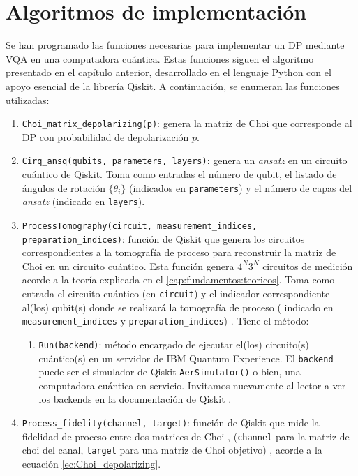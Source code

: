 \documentclass[letterpaper,12pt]{thesisECFM}
\theoremstyle{plain}
\theoremstyle{definition}
\theoremstyle{remark}
\newcommand{\1}{\mathbb{1}}
\begin{document}
\section{Algoritmos de implementación} %
Se han programado las funciones necesarias para implementar un DP mediante VQA
en una computadora cuántica. Estas funciones siguen el algoritmo presentado en
el capítulo anterior, desarrollado en el lenguaje Python con el apoyo esencial
de la librería Qiskit. A continuación, se enumeran las funciones utilizadas: 
\begin{enumerate}
    \item \texttt{Choi\_matrix\_depolarizing(p)}: genera la matriz de Choi que
corresponde al DP con probabilidad de depolarización $p$.

    \item \texttt{Cirq\_ansq(qubits, parameters, layers)}: genera un \textit{ansatz} en
un circuito cuántico de Qiskit. Toma como entradas el número de
 qubit, el listado de ángulos de rotación $\{\theta_i\}$ (indicados en
\texttt{parameters}) y el número de capas del \textit{ansatz} (indicado en
\texttt{layers}).

    \item \texttt{ProcessTomography(circuit, measurement\_indices,
preparation\_indices)}: función de Qiskit que genera los circuitos
correspondientes a la tomografía de proceso para reconstruir la matriz de Choi
en un circuito cuántico. Esta función genera $4^N3^N$ circuitos de medición
acorde a la teoría explicada en el \autoref{cap:fundamentos:teoricos}. Toma como entrada el circuito
cuántico (en  \texttt{circuit})  y el indicador correspondiente al(los)
qubit(s) donde se realizará la tomografía de proceso ( indicado en
\texttt{measurement\_indices} y \texttt{preparation\_indices}) . Tiene el
método: 
    \begin{enumerate}
	\item \texttt{Run(backend)}: método encargado de ejecutar el(los)
circuito(s) cuántico(s) en un servidor de IBM Quantum Experience. El
\texttt{backend} puede ser el simulador de Qiskit  \texttt{AerSimulator()} o
bien, una computadora cuántica en servicio. Invitamos nuevamente al lector a
ver los backends en la documentación de Qiskit \cite{Qiskit_documentation}. 
    \end{enumerate}

    \item \texttt{Process\_fidelity(channel, target)}: función de Qiskit que
mide la fidelidad de proceso entre dos matrices de Choi , (\texttt{channel}
para la matriz de choi del canal, \texttt{target} para una matriz de Choi
objetivo) \cite{Qiskit_documentation}, acorde a la ecuación
\ref{ec:Choi_depolarizing}.


\end{enumerate}
\end{document}
